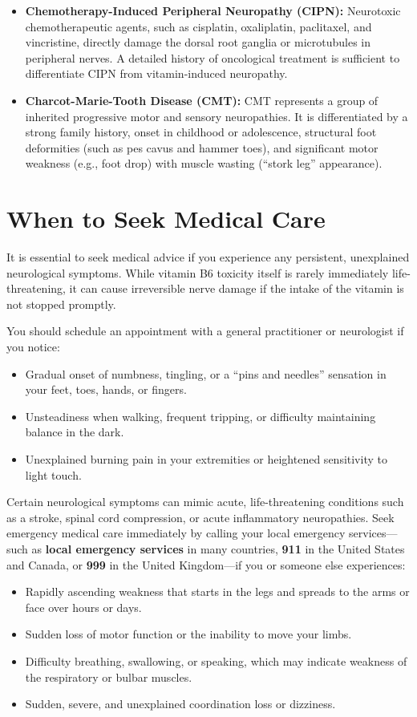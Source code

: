 \begin{itemize}
    \item \textbf{Chemotherapy-Induced Peripheral Neuropathy (CIPN):} Neurotoxic chemotherapeutic agents, such as cisplatin, oxaliplatin, paclitaxel, and vincristine, directly damage the dorsal root ganglia or microtubules in peripheral nerves. A detailed history of oncological treatment is sufficient to differentiate CIPN from vitamin-induced neuropathy.
    \item \textbf{Charcot-Marie-Tooth Disease (CMT):} CMT represents a group of inherited progressive motor and sensory neuropathies. It is differentiated by a strong family history, onset in childhood or adolescence, structural foot deformities (such as pes cavus and hammer toes), and significant motor weakness (e.g., foot drop) with muscle wasting (``stork leg'' appearance).
\end{itemize}

\section*{When to Seek Medical Care}
It is essential to seek medical advice if you experience any persistent, unexplained neurological symptoms. While vitamin B6 toxicity itself is rarely immediately life-threatening, it can cause irreversible nerve damage if the intake of the vitamin is not stopped promptly.

You should schedule an appointment with a general practitioner or neurologist if you notice:
\begin{itemize}
    \item Gradual onset of numbness, tingling, or a ``pins and needles'' sensation in your feet, toes, hands, or fingers.
    \item Unsteadiness when walking, frequent tripping, or difficulty maintaining balance in the dark.
    \item Unexplained burning pain in your extremities or heightened sensitivity to light touch.
\end{itemize}

Certain neurological symptoms can mimic acute, life-threatening conditions such as a stroke, spinal cord compression, or acute inflammatory neuropathies. Seek emergency medical care immediately by calling your local emergency services---such as \textbf{local emergency services} in many countries, \textbf{911} in the United States and Canada, or \textbf{999} in the United Kingdom---if you or someone else experiences:
\begin{itemize}
    \item Rapidly ascending weakness that starts in the legs and spreads to the arms or face over hours or days.
    \item Sudden loss of motor function or the inability to move your limbs.
    \item Difficulty breathing, swallowing, or speaking, which may indicate weakness of the respiratory or bulbar muscles.
    \item Sudden, severe, and unexplained coordination loss or dizziness.
\end{itemize}

